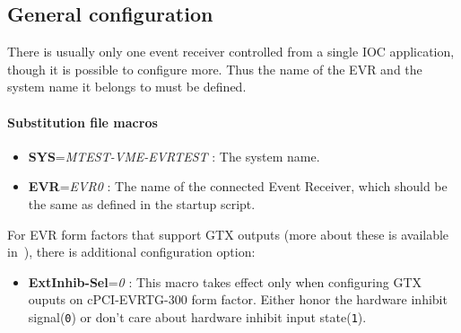 \documentclass[12pt,a4paper]{article}
\begin{document}

\subsection{General configuration}
There is usually only one event receiver controlled from a single IOC application, though it is possible to configure more. Thus the name of the EVR and the system name it belongs to must be defined.

\paragraph{Substitution file macros}
\begin{itemize}
\item
	\textbf{SYS}=\emph{MTEST-VME-EVRTEST} : The system name. 
\item
	\textbf{EVR}=\emph{EVR0} : The name of the connected Event Receiver, which should be the same as defined in the startup script. 
\end{itemize}

For EVR form factors that support GTX outputs (more about these is available in~\cite{mrm_evr}), there is additional configuration option:
\begin{itemize}
\item
	\textbf{ExtInhib-Sel}=\emph{0} : This macro takes effect only when
configuring GTX ouputs on cPCI-EVRTG-300 form factor. Either honor
the hardware inhibit signal(\texttt{0}) or don't care about hardware
inhibit input state(\texttt{1}).
\end{itemize}
\end{document}
